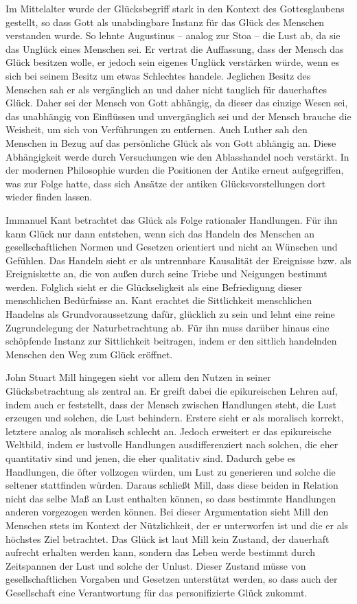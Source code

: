 Im Mittelalter wurde der Glücksbegriff stark in den Kontext des Gottesglaubens gestellt, so dass Gott als unabdingbare Instanz für das Glück des Menschen verstanden wurde. 
So lehnte Augustinus -- analog zur Stoa -- die Lust ab, da sie das Unglück eines Menschen sei. 
Er vertrat die Auffassung, dass der Mensch das Glück besitzen wolle, er jedoch sein eigenes Unglück verstärken würde, wenn es sich bei seinem Besitz um etwas Schlechtes handele. 
Jeglichen Besitz des Menschen sah er als vergänglich an und daher nicht tauglich für dauerhaftes Glück. 
Daher sei der Mensch von Gott abhängig, da dieser das einzige Wesen sei, das unabhängig von Einflüssen und unvergänglich sei und der Mensch brauche die Weisheit, um sich von Verführungen zu entfernen. 
Auch Luther sah den Menschen in Bezug auf das persönliche Glück als von Gott abhängig an. Diese Abhängigkeit werde durch Versuchungen wie den Ablasshandel noch verstärkt. 
In der modernen Philosophie wurden die Positionen der Antike erneut aufgegriffen, was zur Folge hatte, dass sich Ansätze der antiken Glücksvorstellungen dort wieder finden lassen.
 
Immanuel Kant betrachtet das Glück als Folge rationaler Handlungen. 
Für ihn kann Glück nur dann entstehen, wenn sich das Handeln des Menschen an gesellschaftlichen Normen und Gesetzen orientiert und nicht an Wünschen und Gefühlen. 
Das Handeln sieht er als untrennbare Kausalität der Ereignisse bzw. als Ereigniskette an, die von außen durch seine Triebe und Neigungen bestimmt werden. 
Folglich sieht er die Glückseligkeit als eine Befriedigung dieser menschlichen Bedürfnisse an. 
Kant erachtet die Sittlichkeit menschlichen Handelns als Grundvoraussetzung dafür, glücklich zu sein und lehnt eine reine Zugrundelegung der Naturbetrachtung ab. 
Für ihn muss darüber hinaus eine schöpfende Instanz zur Sittlichkeit beitragen, indem er den sittlich handelnden Menschen den Weg zum Glück eröffnet.

John Stuart Mill hingegen sieht vor allem den Nutzen in seiner Glücksbetrachtung als zentral an. 
Er greift dabei die epikureischen Lehren auf, indem auch er feststellt, dass der Mensch zwischen Handlungen steht, die Lust erzeugen und solchen, die Lust behindern. 
Erstere sieht er als moralisch korrekt, letztere analog als moralisch schlecht an. 
Jedoch erweitert er das epikureische Weltbild, indem er lustvolle Handlungen ausdifferenziert nach solchen, die eher quantitativ sind und jenen, die eher qualitativ sind. 
Dadurch gebe es Handlungen, die öfter vollzogen würden, um Lust zu generieren und solche die seltener stattfinden würden. 
Daraus schließt Mill, dass diese beiden in Relation nicht das selbe Maß an Lust enthalten können, so dass bestimmte Handlungen anderen vorgezogen werden können. 
Bei dieser Argumentation sieht Mill den Menschen stets im Kontext der Nützlichkeit, der er unterworfen ist und die er als höchstes Ziel betrachtet. 
Das Glück ist laut Mill kein Zustand, der dauerhaft aufrecht erhalten werden kann, sondern das Leben werde bestimmt durch Zeitspannen der Lust und solche der Unlust. 
Dieser Zustand müsse von gesellschaftlichen Vorgaben und Gesetzen unterstützt werden, so dass auch der Gesellschaft eine Verantwortung für das personifizierte Glück zukommt.

